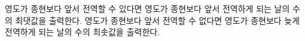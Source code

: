 영도가 종현보다 앞서 전역할 수 있다면 영도가 종현보다 앞서 전역하게 되는 날의 수의 최댓값을 출력한다.
영도가 종현보다 앞서 전역할 수 없다면 영도가 종현보다 늦게 전역하게 되는 날의 수의 최솟값을 출력한다.
